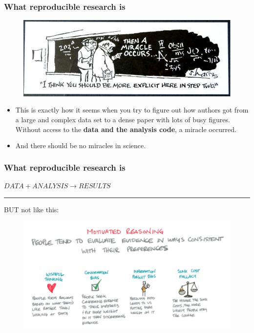 \documentclass{beamer}
\begin{document}
\begin{frame}
\frametitle{What reproducible research is}
\begin{figure}
\includegraphics[scale=0.45]{figures/thenamiracleoccurs.jpg}
\end{figure}
\footnotesize
\begin{itemize}
	\item This is exactly how it seems when you try to figure out how authors got from a large and complex data set to a dense paper with lots of busy figures. \\Without access to the \textbf{data and the analysis code}, a miracle occurred.
\item And  there should be {\sc no miracles in science.} \citep{Markowetz:2016cs}
\end{itemize}
\end{frame}


\begin{frame}
\frametitle{What reproducible research is}
\Large\centering $DATA +  ANALYSIS \rightarrow RESULTS$\\
\pause
\rule{\textwidth}{0.05pt}\vspace{5px}

\centering BUT not like this:
\begin{figure}
\includegraphics[scale=0.25]{figures/motivatedReasoning.png}
\end{figure}
\end{frame}
\end{document}
